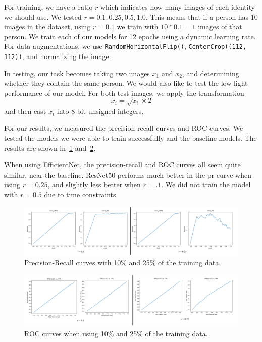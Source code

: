 \documentclass[conference]{IEEEtran}
\begin{document}
For training, we have a ratio $r$ which indicates how many images of each identity we should use.
We tested $r=0.1, 0.25, 0.5, 1.0$.
This means that if a person has $10$ images in the dataset, using $r=0.1$ we train with $10*0.1 = 1$ images of that person.
We train each of our models for 12 epochs using a dynamic learning rate.
For data augmentations, we use \texttt{RandomHorizontalFlip()}, \texttt{CenterCrop((112, 112))}, and
normalizing the image.

In testing, our task becomes taking two images $x_1$ and $x_2$, and deterimining whether they 
contain the same person.
We would also like to test the low-light performance of our model.
For both test images, we apply the transformation
\[x_i = \sqrt{x_i} \times 2\]
and then cast $x_i$ into 8-bit unsigned integers.

For our results, we measured the precision-recall curves and ROC curves.
We tested the models we were able to train successfully and the baseline models.
The results are shown in~\ref{fig:pr} and~\ref{fig:roc}.

When using EfficientNet, the precision-recall and ROC curves all seem quite similar, near the 
baseline.
ResNet50 performs much better in the pr curve when using $r=0.25$, and slightly less better when
$r=.1$.
We did not train the model with $r=0.5$ due to time constraints.
\begin{figure}
	\centering
	\includegraphics[scale=0.4]{pr_curves}
	\caption{Precision-Recall curves with 10\% and 25\% of the training data.}
	\label{fig:pr}
\end{figure}
\begin{figure}
	\centering
	\includegraphics[scale=0.4]{roc_curves}
	\caption{ROC curves when using 10\% and 25\% of the training data.}
	\label{fig:roc}
\end{figure}
\end{document}
